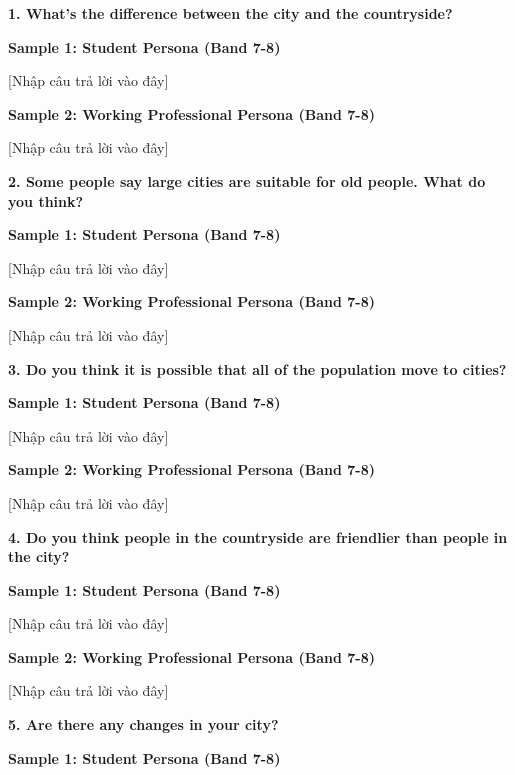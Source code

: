 \partthreeheader

\begin{ieltsquestion}
\textbf{1. What's the difference between the city and the countryside?}
\end{ieltsquestion}
\textbf{Sample 1: Student Persona (Band 7-8)}

[Nhập câu trả lời vào đây]

\textbf{Sample 2: Working Professional Persona (Band 7-8)}

[Nhập câu trả lời vào đây]

\separator

\begin{ieltsquestion}
\textbf{2. Some people say large cities are suitable for old people. What do you think?}
\end{ieltsquestion}
\textbf{Sample 1: Student Persona (Band 7-8)}

[Nhập câu trả lời vào đây]

\textbf{Sample 2: Working Professional Persona (Band 7-8)}

[Nhập câu trả lời vào đây]

\separator

\begin{ieltsquestion}
\textbf{3. Do you think it is possible that all of the population move to cities?}
\end{ieltsquestion}
\textbf{Sample 1: Student Persona (Band 7-8)}

[Nhập câu trả lời vào đây]

\textbf{Sample 2: Working Professional Persona (Band 7-8)}

[Nhập câu trả lời vào đây]

\separator

\begin{ieltsquestion}
\textbf{4. Do you think people in the countryside are friendlier than people in the city?}
\end{ieltsquestion}
\textbf{Sample 1: Student Persona (Band 7-8)}

[Nhập câu trả lời vào đây]

\textbf{Sample 2: Working Professional Persona (Band 7-8)}

[Nhập câu trả lời vào đây]

\separator

\begin{ieltsquestion}
\textbf{5. Are there any changes in your city?}
\end{ieltsquestion}
\textbf{Sample 1: Student Persona (Band 7-8)}

